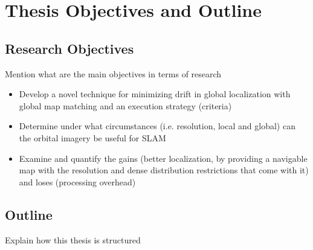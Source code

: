 \section{Thesis Objectives and Outline}

\subsection{Research Objectives}

Mention what are the main objectives in terms of research

\begin{itemize}
    \item Develop a novel technique for minimizing drift in global localization with global map matching and an execution strategy (criteria)
    \item Determine under what circumstances (i.e. resolution, local and global) can the orbital imagery be useful for SLAM
    \item Examine and quantify the gains (better localization, by providing a navigable map with the resolution and dense distribution restrictions that come with it) and loses (processing overhead)
\end{itemize}

\subsection{Outline}

Explain how this thesis is structured

